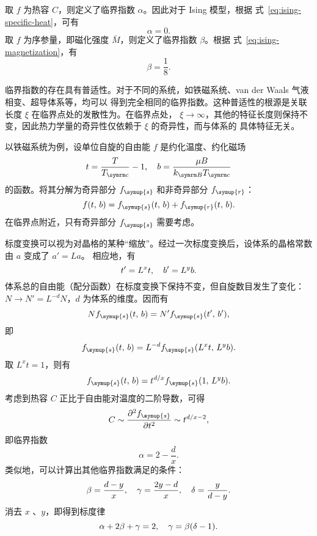 取 $f$ 为热容 $C$，则定义了临界指数 $\alpha$。因此对于 Ising 模型，根据
式~\eqref{eq:ising-specific-heat}，可有
\begin{equation}
  \alpha = 0.
\end{equation}
取 $f$ 为序参量，即磁化强度 $\bar{M}$，则定义了临界指数 $\beta$。根据
式~\eqref{eq:ising-magnetization}，有
\begin{equation}
  \beta = \frac{1}{8}.
\end{equation}

临界指数的存在具有普适性。对于不同的系统，如铁磁系统、van der Waals 气液相变、超导体系等，均可以
得到完全相同的临界指数。这种普适性的根源是关联长度 $\xi$ 在临界点处的发散性为。在临界点处，
$\xi\to\infty$，其他的特征长度则保持不变，因此热力学量的奇异性仅依赖于 $\xi$ 的奇异性，而与体系的
具体特征无关。

以铁磁系统为例，设单位自旋的自由能 $f$ 是约化温度、约化磁场
\begin{equation}
  t = \frac{T}{\Tc} - 1 \qc
  b = \frac{\mu B}{\kB\Tc}
\end{equation}
的函数。将其分解为奇异部分 $f_{\symup{s}}$ 和非奇异部分 $f_{\symup{r}}$：
\begin{equation}
  f(t,\,b) = f_{\symup{s}}(t,\,b) + f_{\symup{r}}(t,\,b).
\end{equation}
在临界点附近，只有奇异部分 $f_{\symup{s}}$ 需要考虑。

标度变换可以视为对晶格的某种“缩放”。经过一次标度变换后，设体系的晶格常数由 $a$ 变成了 $a'=La$。
相应地，有
\begin{equation}
  \label{eq:transform-relation-t-b}
  t' = L^x t \qc b' = L^y b.
\end{equation}
体系总的自由能（配分函数）在标度变换下保持不变，但自旋数目发生了变化：$N \to N'=L^{-d} N$，$d$
为体系的维度。因而有
\begin{equation}
  N f_{\symup{s}} (t,\,b) = N' f_{\symup{s}} (t',\,b'),
\end{equation}
即
\begin{equation}
  f_{\symup{s}} (t,\,b) = L^{-d} f_{\symup{s}} (L^x t, \, L^y b).
\end{equation}
取 $L^x t=1$，则有
\begin{equation}
  f_{\symup{s}} (t,\,b) = t^{d/x} f_{\symup{s}} (1, \, L^y b).
\end{equation}
考虑到热容 $C$ 正比于自由能对温度的二阶导数，可得
\begin{equation}
  C \sim \pdv[2]{f_{\symup{s}}}{t} \sim t^{d/x-2},
\end{equation}
即临界指数
\begin{equation}
  \alpha = 2 - \frac{d}{x}.
\end{equation}
类似地，可以计算出其他临界指数满足的条件：
\begin{equation}
  \beta  = \frac{d-y}{x}  \qc
  \gamma = \frac{2y-d}{x} \qc
  \delta = \frac{y}{d-y}.
\end{equation}
消去 $x$ 、$y$，即得到标度律
\begin{equation}
  \label{eq:scaling-relation-i-ii}
  \alpha + 2\beta + \gamma = 2 \qc
  \gamma = \beta (\delta - 1).
\end{equation}

